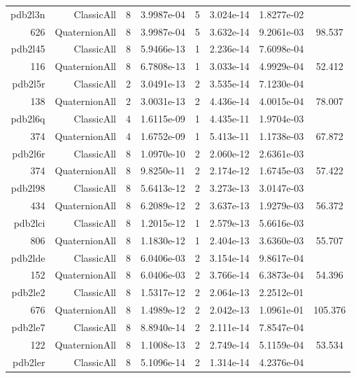 \begin{xltabular}{\textwidth}{r|rcS[table-format=1.4e+2]cS[table-format=1.3e+2]S[table-format=1.4e+2]S[table-format=-1.3]}
pdb2l3n & ClassicAll & 8 & 3.9987e-04 & 5 & 3.024e-14 & 1.8277e-02 & \\
626 & QuaternionAll & 8 & 3.9987e-04 & 5 & 3.632e-14 & 9.2061e-03 & 98.537\\  \addlinespace
pdb2l45 & ClassicAll & 8 & 5.9466e-13 & 1 & 2.236e-14 & 7.6098e-04 & \\
116 & QuaternionAll & 8 & 6.7808e-13 & 1 & 3.033e-14 & 4.9929e-04 & 52.412\\  \addlinespace
pdb2l5r & ClassicAll & 2 & 3.0491e-13 & 2 & 3.535e-14 & 7.1230e-04 & \\
138 & QuaternionAll & 2 & 3.0031e-13 & 2 & 4.436e-14 & 4.0015e-04 & 78.007\\  \addlinespace
pdb2l6q & ClassicAll & 4 & 1.6115e-09 & 1 & 4.435e-11 & 1.9704e-03 & \\
374 & QuaternionAll & 4 & 1.6752e-09 & 1 & 5.413e-11 & 1.1738e-03 & 67.872\\  \addlinespace
pdb2l6r & ClassicAll & 8 & 1.0970e-10 & 2 & 2.060e-12 & 2.6361e-03 & \\
374 & QuaternionAll & 8 & 9.8250e-11 & 2 & 2.174e-12 & 1.6745e-03 & 57.422\\  \addlinespace
pdb2l98 & ClassicAll & 8 & 5.6413e-12 & 2 & 3.273e-13 & 3.0147e-03 & \\
434 & QuaternionAll & 8 & 6.2089e-12 & 2 & 3.637e-13 & 1.9279e-03 & 56.372\\  \addlinespace
pdb2lci & ClassicAll & 8 & 1.2015e-12 & 1 & 2.579e-13 & 5.6616e-03 & \\
806 & QuaternionAll & 8 & 1.1830e-12 & 1 & 2.404e-13 & 3.6360e-03 & 55.707\\  \addlinespace
pdb2lde & ClassicAll & 8 & 6.0406e-03 & 2 & 3.154e-14 & 9.8617e-04 & \\
152 & QuaternionAll & 8 & 6.0406e-03 & 2 & 3.766e-14 & 6.3873e-04 & 54.396\\  \addlinespace
pdb2le2 & ClassicAll & 8 & 1.5317e-12 & 2 & 2.064e-13 & 2.2512e-01 & \\
676 & QuaternionAll & 8 & 1.4989e-12 & 2 & 2.042e-13 & 1.0961e-01 & 105.376\\  \addlinespace
pdb2le7 & ClassicAll & 8 & 8.8940e-14 & 2 & 2.111e-14 & 7.8547e-04 & \\
122 & QuaternionAll & 8 & 1.1008e-13 & 2 & 2.749e-14 & 5.1159e-04 & 53.534\\  \addlinespace
pdb2ler & ClassicAll & 8 & 5.1096e-14 & 2 & 1.314e-14 & 4.2376e-04 & \\

\end{xltabular}
